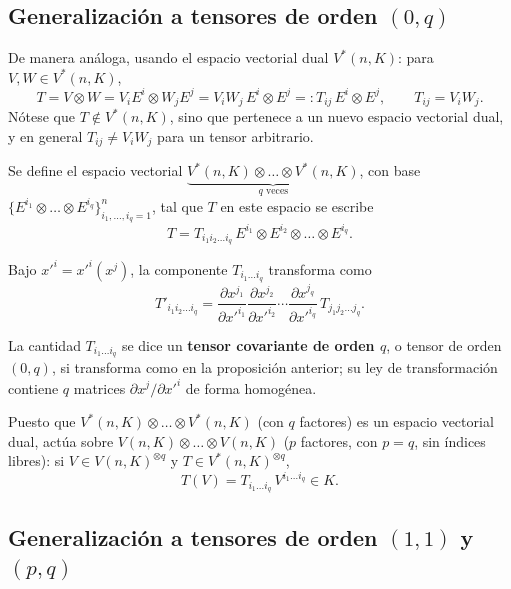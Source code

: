 \subsection{Generalización a tensores de orden \texorpdfstring{$(0,q)$}
{(0,q)}}

De manera análoga, usando el espacio vectorial dual $V^*(n,K)$: para
$V,W\in V^*(n,K)$,
\[
T = V\otimes W = V_iE^i \otimes W_jE^j = V_iW_j\, E^i\otimes E^j =:
T_{ij}\, E^i\otimes E^j, \qquad T_{ij}=V_iW_j.
\]
Nótese que $T\notin V^*(n,K)$, sino que pertenece a un nuevo espacio
vectorial dual, y en general $T_{ij}\neq V_iW_j$ para un tensor
arbitrario.

\begin{definicion}
Se define el espacio vectorial $\underbrace{V^*(n,K)\otimes\dots\otimes
V^*(n,K)}_{q\text{ veces}}$, con base $\{E^{i_1}\otimes\dots\otimes
E^{i_q}\}_{i_1,\dots,i_q=1}^n$, tal que $T$ en este espacio se escribe
\[
T = T_{i_1i_2\dots i_q}\, E^{i_1}\otimes E^{i_2}\otimes\dots\otimes
E^{i_q}.
\]
\end{definicion}

\begin{proposicionc}
Bajo $x'^i=x'^i(x^j)$, la componente $T_{i_1\dots i_q}$ transforma como
\[
T'_{i_1i_2\dots i_q} = \frac{\partial x^{j_1}}{\partial x'^{i_1}}
\frac{\partial x^{j_2}}{\partial x'^{i_2}} \cdots \frac{\partial
x^{j_q}}{\partial x'^{i_q}}\, T_{j_1j_2\dots j_q}.
\]
\end{proposicionc}

\begin{definicion}
La cantidad $T_{i_1\dots i_q}$ se dice un \textbf{tensor covariante de
orden $q$}, o tensor de orden $(0,q)$, si transforma como en la
proposición anterior; su ley de transformación contiene $q$ matrices
$\partial x^j/\partial x'^i$ de forma homogénea.
\end{definicion}

Puesto que $V^*(n,K)\otimes\dots\otimes V^*(n,K)$ (con $q$ factores) es
un espacio vectorial dual, actúa sobre $V(n,K)\otimes\dots\otimes
V(n,K)$ ($p$ factores, con $p=q$, sin índices libres): si
$V\in V(n,K)^{\otimes q}$ y $T\in V^*(n,K)^{\otimes q}$,
\[
T(V) = T_{i_1\dots i_q}\, V^{i_1\dots i_q} \in K .
\]

\subsection{Generalización a tensores de orden \texorpdfstring{$(1,1)$}
{(1,1)} y \texorpdfstring{$(p,q)$}{(p,q)}}

